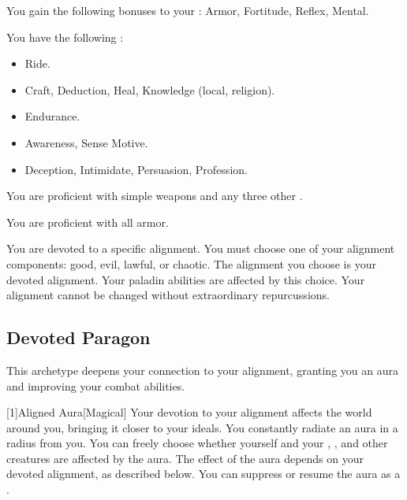         You gain the following bonuses to your :  Armor,  Fortitude,  Reflex,  Mental.

        You have the following :
        \begin{itemize}
            \item {} Ride.
            \item {} Craft, Deduction, Heal, Knowledge (local, religion).
            \item {} Endurance.
            \item {} Awareness, Sense Motive.
            \item {} Deception, Intimidate, Persuasion, Profession.
        \end{itemize}

        You are proficient with simple weapons and any three other .

        You are proficient with all armor.

        You are devoted to a specific alignment.
        You must choose one of your alignment components: good, evil, lawful, or chaotic.
        The alignment you choose is your devoted alignment.
        Your paladin abilities are affected by this choice.
        Your alignment cannot be changed without extraordinary repurcussions.

    \subsection{Devoted Paragon}
        This archetype deepens your connection to your alignment, granting you an aura and improving your combat abilities.

        [1]{Aligned Aura}[Magical]
        Your devotion to your alignment affects the world around you, bringing it closer to your ideals.
        You constantly radiate an aura in a \areamed radius  from you.
        You can freely choose whether yourself and your , , and other creatures are affected by the aura.
        The effect of the aura depends on your devoted alignment, as described below.
        You can suppress or resume the aura as a .

